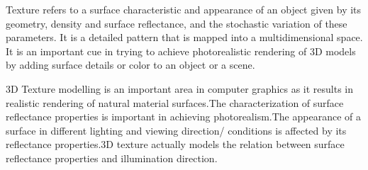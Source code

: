 \label{sec:intro}


Texture refers to a surface characteristic and appearance of an object given by
its geometry, density and surface reflectance, and the stochastic variation of
these parameters.
It is a detailed pattern that is mapped into a multidimensional space.
It is an important cue in trying to achieve photorealistic
rendering of 3D models by adding surface details or color to an object or a
scene. 

3D Texture modelling is an important area in computer graphics as it results in realistic rendering
of natural material surfaces.The characterization of surface reflectance properties is important in
achieving photorealism.The appearance of a surface in different lighting and viewing direction/
conditions is affected by its reflectance properties.3D texture actually models the relation
between surface reflectance properties and illumination direction.


